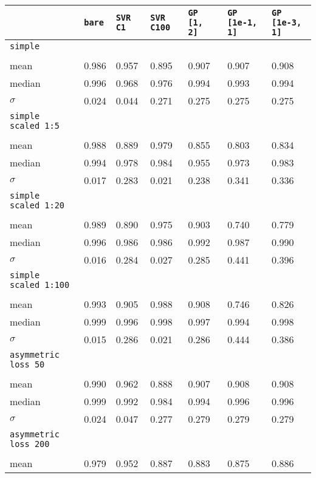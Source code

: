 \begin{center}
\begin{longtabu}{>{\scriptsize}l|>{\scriptsize}l|>{\scriptsize}l|>{\scriptsize}l|>{\scriptsize}l|>{\scriptsize}l|>{\scriptsize}l}

&\texttt{bare} &\texttt{SVR C1} &\texttt{SVR C100} &\texttt{GP [1, 2]} &\texttt{GP [1e-1, 1]} &\texttt{GP [1e-3, 1]} \\
\hline
\texttt{simple} &&&&&& \\ &&&&&&\\
mean &0.986 &0.957 &0.895 &0.907 &0.907 &0.908 \\
median &0.996 &0.968 &0.976 &0.994 &0.993 &0.994 \\
$\sigma$ &0.024 &0.044 &0.271 &0.275 &0.275 &0.275 \\
\hline
\texttt{simple scaled 1:5} &&&&&& \\ &&&&&&\\
mean &0.988 &0.889 &0.979 &0.855 &0.803 &0.834 \\
median &0.994 &0.978 &0.984 &0.955 &0.973 &0.983 \\
$\sigma$ &0.017 &0.283 &0.021 &0.238 &0.341 &0.336 \\
\hline
\texttt{simple scaled 1:20} &&&&&& \\ &&&&&&\\
mean &0.989 &0.890 &0.975 &0.903 &0.740 &0.779 \\
median &0.996 &0.986 &0.986 &0.992 &0.987 &0.990 \\
$\sigma$ &0.016 &0.284 &0.027 &0.285 &0.441 &0.396 \\
\hline
\texttt{simple scaled 1:100} &&&&&& \\ &&&&&&\\
mean &0.993 &0.905 &0.988 &0.908 &0.746 &0.826 \\
median &0.999 &0.996 &0.998 &0.997 &0.994 &0.998 \\
$\sigma$ &0.015 &0.286 &0.021 &0.286 &0.444 &0.386 \\
\hline
\texttt{asymmetric loss 50} &&&&&& \\ &&&&&&\\
mean &0.990 &0.962 &0.888 &0.907 &0.908 &0.908 \\
median &0.999 &0.992 &0.984 &0.994 &0.996 &0.996 \\
$\sigma$ &0.024 &0.047 &0.277 &0.279 &0.279 &0.279 \\
\hline
\texttt{asymmetric loss 200} &&&&&& \\ &&&&&&\\
mean &0.979 &0.952 &0.887 &0.883 &0.875 &0.886 \\

\end{longtabu}
\end{center}
